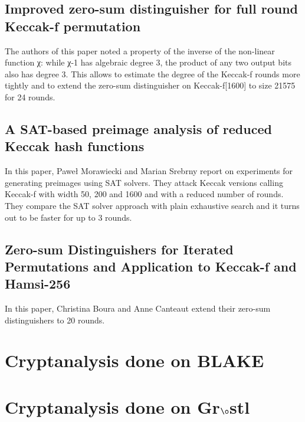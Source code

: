 \subsection{Improved zero-sum distinguisher for full round Keccak-f permutation} \cite{00026}
The authors of this paper noted a property of the inverse of the non-linear function χ: while χ-1 has algebraic degree 3,
the product of any two output bits also has degree 3. This allows to estimate the degree of the Keccak-f rounds more tightly 
and to extend the zero-sum distinguisher on Keccak-f[1600] to size 21575 for 24 rounds.

\subsection{A SAT-based preimage analysis of reduced Keccak hash functions} \cite{00027}
In this paper, Paweł Morawiecki and Marian Srebrny report on experiments for generating preimages using SAT solvers. 
They attack Keccak versions calling Keccak-f with width 50, 200 and 1600 and with a reduced number of rounds. 
They compare the SAT solver approach with plain exhaustive search and it turns out to be faster for up to 3 rounds.

\subsection{Zero-sum Distinguishers for Iterated Permutations and Application to Keccak-f and Hamsi-256} \cite{00028}
In this paper, Christina Boura and Anne Canteaut extend their zero-sum distinguishers to 20 rounds.

\section{Cryptanalysis done on BLAKE}

\section{Cryptanalysis done on Gr$\o$stl}
